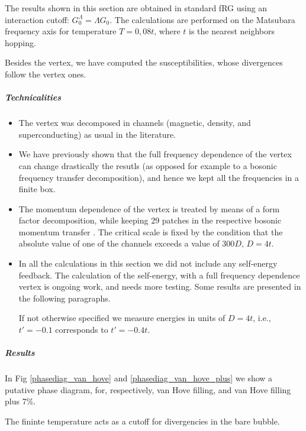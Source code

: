 The results shown in this section are obtained in standard fRG using an interaction cutoff: $G_0^\Lambda = \Lambda G_0$. The calculations are performed on the Matsubara frequency axis for temperature $T=0,08 t$, where $t$ is the nearest neighbors hopping.  

Besides the vertex, we have computed the susceptibilities, whose divergences follow the vertex ones. 

\subparagraph{Technicalities}
\begin{itemize} 

\item The vertex was decomposed in channels (magnetic, density, and superconducting) as usual in the literature. 

\item We have previously shown that the full frequency dependence of the vertex can change drastically the resutls (as opposed for example to a bosonic frequency transfer decomposition), and hence we kept all the frequencies in a finite box. 

\item The momentum dependence of the vertex is treated by means of a form factor decomposition, while keeping 29 patches in the respective bosonic momentum transfer . The critical scale is fixed by the condition that the absolute value of one of the channels exceeds a value of 300$D$, $D=4t$. 


\item In all the calculations in this section we did not include any self-energy feedback. The calculation of the self-energy, with a full frequency dependence vertex  is ongoing work, and needs more testing. Some results are presented in the following paragraphs. 
 
If not otherwise specified we measure energies in units of $D=4t$, i.e., $t'=-0.1$ corresponds to $t'=-0.4t$.
\end{itemize} 
 
\subparagraph{Results} 

In Fig \ref{phasediag_van_hove} and \ref{phasediag_van_hove_plus} we show  a putative phase diagram, for, respectively, van Hove filling, and van Hove filling plus 7\%. 

The fininte temperature acts as a cutoff for divergencies in the bare bubble. 

